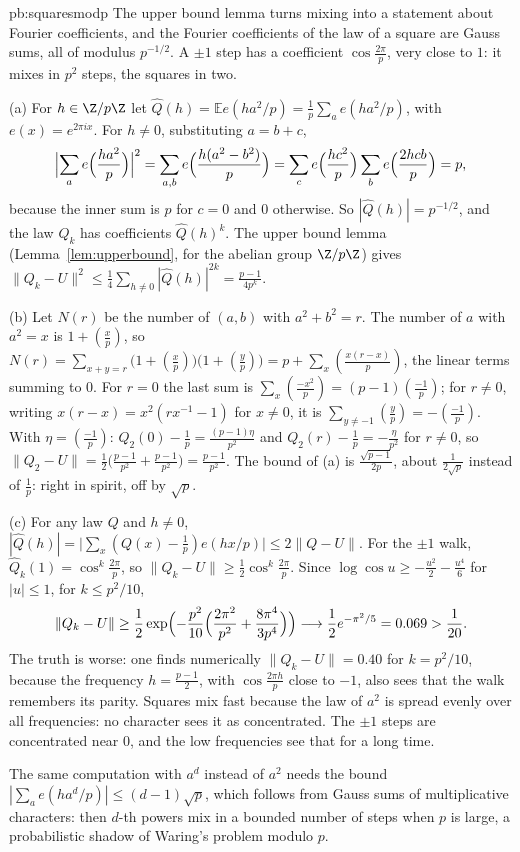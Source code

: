 \begin{solution}{pb:squaresmodp}
\idea The upper bound lemma turns mixing into a statement about Fourier coefficients, and the Fourier coefficients of the law of a square are Gauss sums, all of
modulus $p^{-1/2}$. A $\pm1$ step has a coefficient $\cos\frac{2\pi}p$, very close to $1$: it mixes in $p^2$ steps, the squares in two.

\writeup (a) For $h\in\Z/p\Z$ let $\hat Q(h)=\mathbb Ee(ha^2/p)=\frac1p\sum_ae(ha^2/p)$, with $e(x)=e^{2\pi ix}$. For $h\ne0$, substituting $a=b+c$,
\[
\Bigl|\sum_ae\Bigl(\frac{ha^2}p\Bigr)\Bigr|^2=\sum_{a,b}e\Bigl(\frac{h(a^2-b^2)}p\Bigr)=\sum_c e\Bigl(\frac{hc^2}p\Bigr)\sum_be\Bigl(\frac{2hcb}p\Bigr)=p,
\]
because the inner sum is $p$ for $c=0$ and $0$ otherwise. So $|\hat Q(h)|=p^{-1/2}$, and the law $Q_k$ has coefficients $\hat Q(h)^k$. The upper bound lemma
(Lemma~\ref{lem:upperbound}, for the abelian group $\Z/p\Z$) gives $\|Q_k-U\|^2\le\frac14\sum_{h\ne0}|\hat Q(h)|^{2k}=\frac{p-1}{4p^k}$.

(b) Let $N(r)$ be the number of $(a,b)$ with $a^2+b^2=r$. The number of $a$ with $a^2=x$ is $1+\left(\frac xp\right)$, so
$N(r)=\sum_{x+y=r}\bigl(1+(\frac xp)\bigr)\bigl(1+(\frac yp)\bigr)=p+\sum_x\left(\frac{x(r-x)}p\right)$, the linear terms summing to $0$. For $r=0$ the last sum is
$\sum_x\left(\frac{-x^2}p\right)=(p-1)\left(\frac{-1}p\right)$; for $r\ne0$, writing $x(r-x)=x^2(rx^{-1}-1)$ for $x\ne0$, it is $\sum_{y\ne-1}\left(\frac yp\right)=-\left(\frac{-1}p\right)$.
With $\eta=\left(\frac{-1}p\right)$: $Q_2(0)-\frac1p=\frac{(p-1)\eta}{p^2}$ and $Q_2(r)-\frac1p=-\frac\eta{p^2}$ for $r\ne0$, so
$\|Q_2-U\|=\frac12\bigl(\frac{p-1}{p^2}+\frac{p-1}{p^2}\bigr)=\frac{p-1}{p^2}$. The bound of (a) is $\frac{\sqrt{p-1}}{2p}$, about $\frac1{2\sqrt p}$ instead of $\frac1p$: right in spirit, off
by $\sqrt p$.

(c) For any law $Q$ and $h\ne0$, $|\hat Q(h)|=\bigl|\sum_x(Q(x)-\frac1p)e(hx/p)\bigr|\le2\|Q-U\|$. For the $\pm1$ walk, $\hat Q_k(1)=\cos^k\frac{2\pi}p$, so
$\|Q_k-U\|\ge\frac12\cos^k\frac{2\pi}p$. Since $\log\cos u\ge-\frac{u^2}2-\frac{u^4}6$ for $|u|\le1$, for $k\le p^2/10$,
\[
\|Q_k-U\|\ge\frac12\exp\Bigl(-\frac{p^2}{10}\Bigl(\frac{2\pi^2}{p^2}+\frac{8\pi^4}{3p^4}\Bigr)\Bigr)\longrightarrow\frac12e^{-\pi^2/5}=0.069>\frac1{20}.
\]
The truth is worse: one finds numerically $\|Q_k-U\|=0.40$ for $k=p^2/10$, because the frequency $h=\frac{p-1}2$, with $\cos\frac{2\pi h}p$ close to $-1$, also sees that the
walk remembers its parity.
Squares mix fast because the law of $a^2$ is spread evenly over all frequencies: no character sees it as concentrated. The $\pm1$ steps are concentrated near $0$, and
the low frequencies see that for a long time.

\leads The same computation with $a^d$ instead of $a^2$ needs the bound $|\sum_ae(ha^d/p)|\le(d-1)\sqrt p$, which follows from Gauss sums of multiplicative
characters: then $d$-th powers mix in a bounded
number of steps when $p$ is large, a probabilistic shadow of Waring's problem modulo $p$.
\end{solution}

